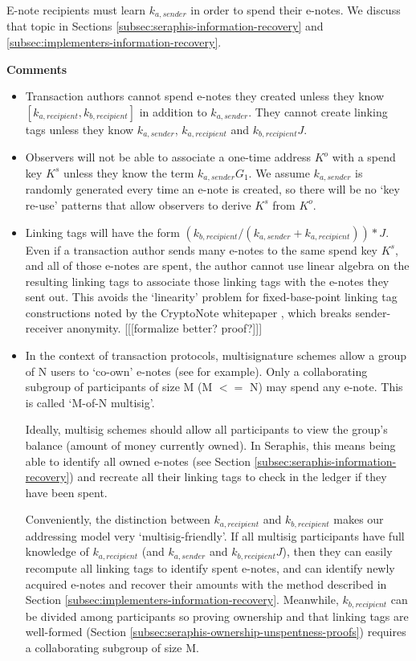 E-note recipients must learn $k_{a, sender}$ in order to spend their e-notes. We discuss that topic in Sections \ref{subsec:seraphis-information-recovery} and \ref{subsec:implementers-information-recovery}.

\textbf{Comments}

\begin{itemize}
    \item Transaction authors cannot spend e-notes they created unless they know $[k_{a, recipient}, k_{b, recipient}]$ in addition to $k_{a, sender}$. They cannot create linking tags unless they know $k_{a, sender}$, $k_{a, recipient}$ and $k_{b, recipient} J$.

    \item Observers will not be able to associate a one-time address $K^o$ with a spend key $K^s$ unless they know the term $k_{a,sender} G_1$. We assume $k_{a,sender}$ is randomly generated every time an e-note is created, so there will be no `key re-use' patterns that allow observers to derive $K^s$ from $K^o$.

    \item Linking tags will have the form $(k_{b, recipient}/(k_{a, sender} + k_{a, recipient}))*J$. Even if a transaction author sends many e-notes to the same spend key $K^s$, and all of those e-notes are spent, the author cannot use linear algebra on the resulting linking tags to associate those linking tags with the e-notes they sent out. This avoids the `linearity' problem for fixed-base-point linking tag constructions noted by the CryptoNote whitepaper \cite{cryptoNoteWhitePaper}, which breaks sender-receiver anonymity. [[[formalize better? proof?]]]

    \item In the context of transaction protocols, multisignature schemes allow a group of N users to `co-own' e-notes (see \cite{MRL-0009-multisig} for example). Only a collaborating subgroup of participants of size M (M $<=$ N) may spend any e-note. This is called `M-of-N multisig'.

    Ideally, multisig schemes should allow all participants to view the group's balance (amount of money currently owned). In Seraphis, this means being able to identify all owned e-notes (see Section \ref{subsec:seraphis-information-recovery}) and recreate all their linking tags to check in the ledger if they have been spent.

    Conveniently, the distinction between $k_{a, recipient}$ and $k_{b, recipient}$ makes our addressing model very `multisig-friendly'. If all multisig participants have full knowledge of $k_{a, recipient}$ (and $k_{a,sender}$ and $k_{b, recipient} J$), then they can easily recompute all linking tags to identify spent e-notes, and can identify newly acquired e-notes and recover their amounts with the method described in Section \ref{subsec:implementers-information-recovery}. Meanwhile, $k_{b, recipient}$ can be divided among participants so proving ownership and that linking tags are well-formed (Section \ref{subsec:seraphis-ownership-unspentness-proofs}) requires a collaborating subgroup of size M.


\end{itemize}
